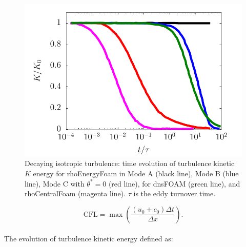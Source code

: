 \documentclass[a5paper]{sapthesis}
\begin{document}
	\begin{figure}[h]
		\centering
		\includegraphics[width=0.7\linewidth]{Figures/TKE_DIT}
		\caption[Turbulence kinetic energy for the decaying isotropic turbulence case]{Decaying isotropic turbulence: time evolution of turbulence kinetic $K$ energy for rhoEnergyFoam in Mode A (black line), Mode B (blue line), Mode C with $\theta^* = 0$ (red line), for dnsFOAM (green line), and rhoCentralFoam (magenta line). $\tau$ is the eddy turnover time.}
		\label{DIT}
	\end{figure} 
	
	\begin{equation}
		\text{CFL} = \max \left( \frac{(u_0 + c_0) \Delta t}{\Delta x} \right).
	\end{equation}
	\\
	The evolution of turbulence kinetic energy defined as:
	
\end{document}
